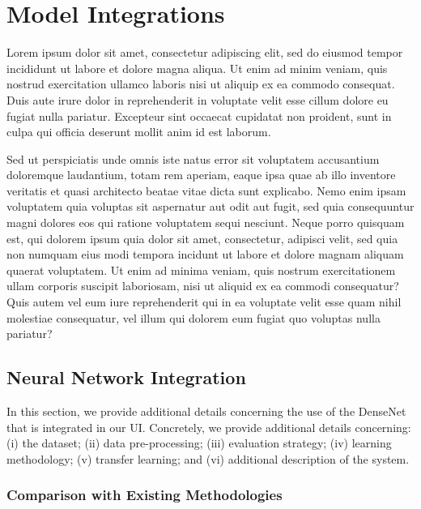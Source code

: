 \chapter{Model Integrations}
\label{chap:app003}

Lorem ipsum dolor sit amet, consectetur adipiscing elit, sed do eiusmod tempor incididunt ut labore et dolore magna aliqua. Ut enim ad minim veniam, quis nostrud exercitation ullamco laboris nisi ut aliquip ex ea commodo consequat. Duis aute irure dolor in reprehenderit in voluptate velit esse cillum dolore eu fugiat nulla pariatur. Excepteur sint occaecat cupidatat non proident, sunt in culpa qui officia deserunt mollit anim id est laborum.

Sed ut perspiciatis unde omnis iste natus error sit voluptatem accusantium doloremque laudantium, totam rem aperiam, eaque ipsa quae ab illo inventore veritatis et quasi architecto beatae vitae dicta sunt explicabo. Nemo enim ipsam voluptatem quia voluptas sit aspernatur aut odit aut fugit, sed quia consequuntur magni dolores eos qui ratione voluptatem sequi nesciunt. Neque porro quisquam est, qui dolorem ipsum quia dolor sit amet, consectetur, adipisci velit, sed quia non numquam eius modi tempora incidunt ut labore et dolore magnam aliquam quaerat voluptatem. Ut enim ad minima veniam, quis nostrum exercitationem ullam corporis suscipit laboriosam, nisi ut aliquid ex ea commodi consequatur? Quis autem vel eum iure reprehenderit qui in ea voluptate velit esse quam nihil molestiae consequatur, vel illum qui dolorem eum fugiat quo voluptas nulla pariatur?

\section{Neural Network Integration}
\label{sec:app003001}

In this section, we provide additional details concerning the use of the DenseNet that is integrated in our UI.
Concretely, we provide additional details concerning:
(i) the dataset;
(ii) data pre-processing;
(iii) evaluation strategy;
(iv) learning methodology;
(v) transfer learning; and
(vi) additional description of the system.

\subsection{Comparison with Existing Methodologies}
\label{sec:app003001001}


